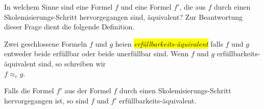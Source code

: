 In welchem Sinne sind eine Formel $f$ und eine Formel $f'$, die aus $f$ durch einen 
Skolem\-isierungs-Schritt hervorgegangen sind, \"{a}quivalent?  Zur Beantwortung dieser Frage
dient die folgende Definition. 

\begin{Definition}
   Zwei geschlossene Formeln $f$ und $g$ hei\3en 
   \colorbox{yellow}{\emph{erf\"{u}llbarkeits-\"{a}quivalent}}
   falls $f$ und $g$ entweder beide erf\"{u}llbar oder beide unerf\"{u}llbar sind.
   Wenn $f$ und $g$ erf\"{u}llbarkeits-\"{a}quivalent sind, so schreiben wir \\[0.2cm]
   \hspace*{1.3cm} $f \approx_e g$.
\eox
\end{Definition}


\noindent
\begin{Satz}
  Falls die Formel $f'$ aus der Formel $f$ durch einen Skolemisierungs-Schritt 
  hervorgegangen ist, so sind $f$ und $f'$ erf\"{u}llbarkeits-\"{a}quivalent.
\end{Satz}


